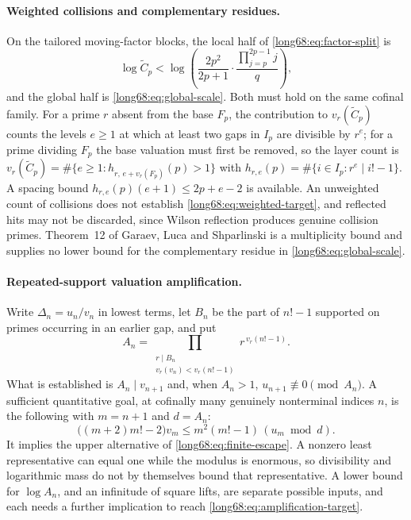 \documentclass[11pt]{article}
\begin{document}
\paragraph{Weighted collisions and complementary residues.}
On the tailored moving-factor blocks, the local half of
\eqref{long68:eq:factor-split} is
\begin{equation}\label{long68:eq:weighted-target}
 \log\widetilde C_p
 <\log\left(\frac{2p^2}{2p+1}\cdot
       \frac{\prod_{j=p}^{2p-1}j}{q}\right),
\end{equation}
and the global half is \eqref{long68:eq:global-scale}.  Both must hold on the same
cofinal family.  For a prime $r$ absent from the base $F_p$, the contribution
to $v_r(\widetilde C_p)$ counts the levels $e\ge1$ at which at least two gaps
in $I_p$ are divisible by $r^e$; for a prime dividing $F_p$ the base
valuation must first be removed, so the layer count is
$v_r(\widetilde C_p)=\#\{e\ge1:h_{r,\,e+v_r(F_p)}(p)>1\}$ with
$h_{r,e}(p)=\#\{i\in I_p:r^e\mid i!-1\}$.  A spacing bound
$h_{r,e}(p)(e+1)\le2p+e-2$ is available.  An unweighted count of collisions
does not establish \eqref{long68:eq:weighted-target}, and reflected hits may not be
discarded, since Wilson reflection produces genuine collision primes.
Theorem~12 of Garaev, Luca and Shparlinski
\cite[arXiv v1, Thm.~12, p.~16]{garaev-luca-shparlinski} is a multiplicity
bound and supplies no lower bound for the complementary residue in
\eqref{long68:eq:global-scale}.

\paragraph{Repeated-support valuation amplification.}
Write $\Delta_n=u_n/v_n$ in lowest terms, let $B_n$ be the part of $n!-1$
supported on primes occurring in an earlier gap, and put
\[
 A_n=\prod_{\substack{r\mid B_n\\ v_r(v_n)<v_r(n!-1)}}r^{\,v_r(n!-1)} .
\]
What is established is $A_n\mid v_{n+1}$ and, when $A_n>1$,
$u_{n+1}\not\equiv0\pmod{A_n}$.  A sufficient quantitative goal, at cofinally
many genuinely nonterminal indices $n$, is the following with $m=n+1$ and
$d=A_n$:
\begin{equation}\label{long68:eq:amplification-target}
 \bigl((m+2)m!-2\bigr)v_m
 \le m^2(m!-1)\,(u_m\bmod d).
\end{equation}
It implies the upper alternative of \eqref{long68:eq:finite-escape}.  A nonzero
least representative can equal one while the modulus is enormous, so
divisibility and logarithmic mass do not by themselves bound that
representative.  A lower bound for $\log A_n$, and an infinitude of square
lifts, are separate possible inputs, and each needs a further implication to
reach \eqref{long68:eq:amplification-target}.
\end{document}
